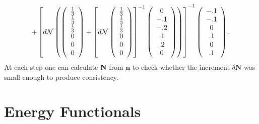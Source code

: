 \documentclass[aps,preprint]{revtex4}%
\begin{document}
\begin{equation}
+\left[  d\mathcal{N}\left(  \left(
\begin{array}
[c]{c}%
\frac{1}{3}\\
\frac{1}{3}\\
\frac{1}{3}\\
0\\
0\\
0
\end{array}
\right)  +\left[  d\mathcal{N}\left(
\begin{array}
[c]{c}%
\frac{1}{3}\\
\frac{1}{3}\\
\frac{1}{3}\\
0\\
0\\
0
\end{array}
\right)  \right]  ^{-1}\left(
\begin{array}
[c]{c}%
0\\
-.1\\
-.2\\
.1\\
.2\\
0
\end{array}
\right)  \right)  \right]  ^{-1}\left(
\begin{array}
[c]{c}%
-.1\\
-.1\\
0\\
.1\\
0\\
.1
\end{array}
\right)  .
\end{equation}
At each step one can calculate $\bm{N}$ from $\bm{n}$ to check whether the
increment $\delta\bm{N}$ was small enough to produce consistency.

\section{Energy Functionals\label{En_Funcs}}
\end{document}
